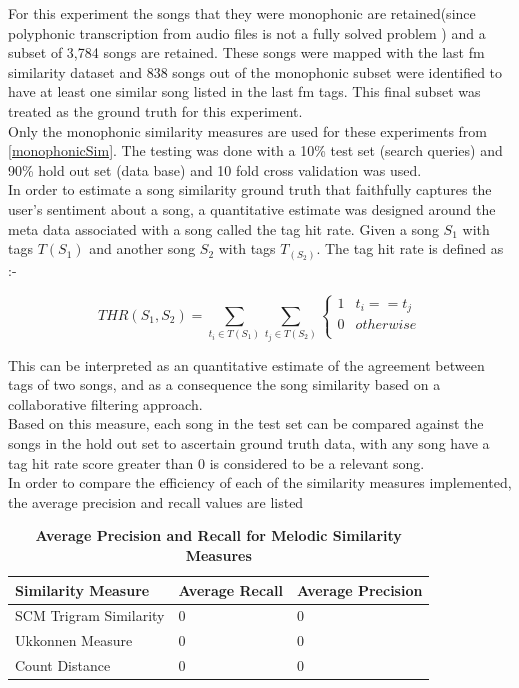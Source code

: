 \noindent For this experiment the songs that they were monophonic are retained(since polyphonic transcription from audio files is not a fully solved problem \cite{melextract}) and a subset of 3,784 songs are retained. These songs were mapped with the last fm similarity dataset and 838 songs out of the monophonic subset were identified to have at least one similar song listed in the last fm tags. This final subset was treated as the ground truth for this experiment. \\

\noindent Only the monophonic similarity measures are used for these experiments from \ref{monophonicSim}. The testing was done with a 10\% test set (search queries) and 90\% hold out set (data base) and 10 fold cross validation was used. \\

\noindent In order to estimate a song similarity ground truth that faithfully captures the user's sentiment about a song, a quantitative estimate was designed around the meta data associated with a song called the tag hit rate. Given a song $S_1$ with tags $T(S_1)$ and another song $S_2$ with tags $T_(S_2)$. The tag hit rate is defined as :-

\begin{equation} \label{taghitrate}
THR(S_1, S_2) = \sum_{t_i \in T(S_1)} \sum_{t_j \in T(S_2)} \begin{cases} 
      1 & t_i == t_j \\
      0 & otherwise \\  \end{cases}
\end{equation}

\noindent This can be interpreted as an quantitative estimate of the agreement between tags of two songs, and as a consequence the song similarity based on a collaborative filtering approach. \\

\noindent Based on this measure, each song in the test set can be compared against the songs in the hold out set to ascertain ground truth data, with any song have a tag hit rate score greater than 0 is considered to be a relevant song. \\

\noindent In order to compare the efficiency of each of the similarity measures implemented, the average precision and recall values are listed \\

\begin{table}[h]
\begin{center}
    \begin{tabular}{| l | l | l |}
    \hline
    Similarity Measure & Average Recall & Average Precision \\ \hline
    SCM Trigram Similarity & 0 & 0 \\ \hline
    Ukkonnen Measure & 0 & 0 \\ \hline
    Count Distance & 0 & 0  \\
    \hline
    \end{tabular}
\end{center}
\caption{\textbf{Average Precision and Recall for Melodic Similarity Measures}}
\end{table}


